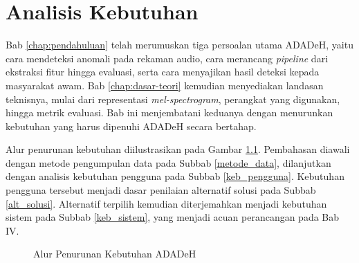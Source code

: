 \cleardoublepage
\chapter{Analisis Kebutuhan}
\label{chap:analisis-kebutuhan}

Bab \ref{chap:pendahuluan} telah merumuskan tiga persoalan utama ADADeH, yaitu cara mendeteksi anomali pada rekaman audio, cara merancang \textit{pipeline} dari ekstraksi fitur hingga evaluasi, serta cara menyajikan hasil deteksi kepada masyarakat awam. Bab \ref{chap:dasar-teori} kemudian menyediakan landasan teknisnya, mulai dari representasi \textit{mel-spectrogram}, perangkat yang digunakan, hingga metrik evaluasi. Bab ini menjembatani keduanya dengan menurunkan kebutuhan yang harus dipenuhi ADADeH secara bertahap.

Alur penurunan kebutuhan diilustrasikan pada Gambar \ref{fig:alur_bab3}. Pembahasan diawali dengan metode pengumpulan data pada Subbab \ref{metode_data}, dilanjutkan dengan analisis kebutuhan pengguna pada Subbab \ref{keb_pengguna}. Kebutuhan pengguna tersebut menjadi dasar penilaian alternatif solusi pada Subbab \ref{alt_solusi}. Alternatif terpilih kemudian diterjemahkan menjadi kebutuhan sistem pada Subbab \ref{keb_sistem}, yang menjadi acuan perancangan pada Bab IV.

\begin{figure}[h]
  \centering
  \caption{Alur Penurunan Kebutuhan ADADeH}
  \label{fig:alur_bab3}
\end{figure}

